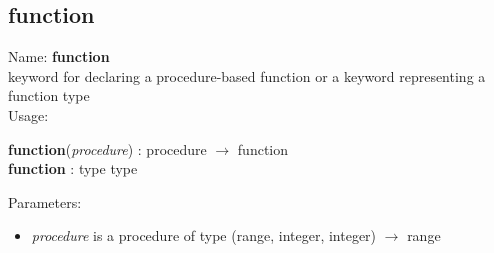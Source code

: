 \subsection{function}
\label{labfunction}
\noindent Name: \textbf{function}\\
\phantom{aaa}keyword for declaring a procedure-based function or a keyword representing a \textsf{function} type \\[0.2cm]
\noindent Usage: 
\begin{center}
\textbf{function}(\emph{procedure})  : \textsf{procedure} $\rightarrow$ \textsf{function}\\
\textbf{function} : \textsf{type type}\\
\end{center}
Parameters: 
\begin{itemize}
\item \emph{procedure} is a procedure of type (\textsf{range}, \textsf{integer}, \textsf{integer}) $\rightarrow$ \textsf{range}
\end{itemize}
